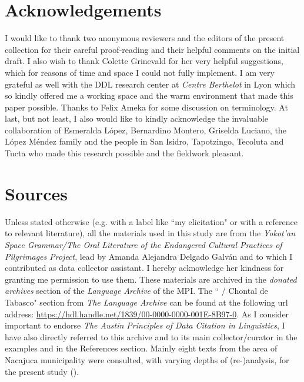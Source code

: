 \documentclass[output=paper
,modfonts
,nonflat]{langsci/langscibook}
\begin{document}
\section*{Acknowledgements}
I would like to thank two anonymous reviewers and the editors of the present collection for their careful proof-reading and their helpful comments on the initial draft. I also wish to thank Colette Grinevald for her very helpful suggestions, which for reasons of time and space I could not fully implement. I am very grateful as well with the DDL research center at \textit{Centre Berthelot} in Lyon which so kindly offered me a working space and the warm environment that made this paper possible. Thanks to Felix Ameka for some discussion on terminology. At last, but not least, I also would like to kindly acknowledge the invaluable collaboration of Esmeralda López, Bernardino Montero, Griselda Luciano, the López Méndez family and the people in San Isidro, Tapotzingo, Tecoluta and Tucta who made this research possible and the fieldwork pleasant.


\section*{Sources}\label{sec:pico:sources}

Unless stated otherwise (e.g. with a label like ``my elicitation" or with a reference to relevant literature), all the materials used in this study are from the \textit{Yokot'an Space Grammar/The Oral Literature of the Endangered Cultural Practices of  Pilgrimages Project}, lead by Amanda Alejandra Delgado Galván and to which I contributed as data collector assistant. I hereby acknowledge her kindness for granting me permission to use them.
These materials are archived in the \textit{donated archives} section of the \textit{Language Archive} of the MPI.
The `` / Chontal de Tabasco" section from \textit{The Language Archive} can be found at the following url address: \url{https://hdl.handle.net/1839/00-0000-0000-001E-8B97-0}.
As I consider important to endorse \textit{The Austin Principles of Data Citation in Linguistics}, I have also directly referred to this archive and to its main collector/curator in the examples and in the References section.
Mainly eight texts from the area of Nacajuca municipality were consulted, with varying depths of (re-)analysis, for the present study ().\largerpage[2]
\end{document}
